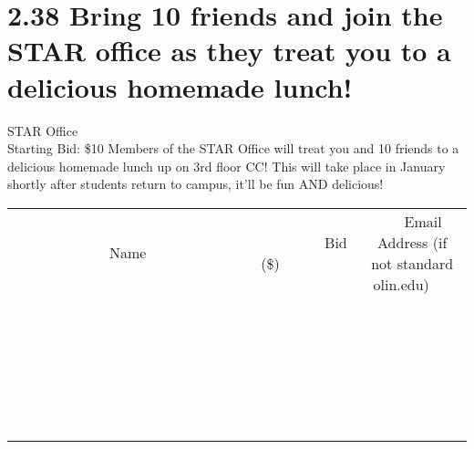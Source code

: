 \documentclass[11pt]{article}
\begin{document}
\section*{2.38 Bring 10 friends and join the STAR office as they treat you to a delicious homemade lunch!    }
STAR Office
\\
Starting Bid: \$10
\newline
Members of the STAR Office will treat you and 10 friends to a delicious homemade lunch up on 3rd floor CC!  This will take place in January shortly after students return to campus, it'll be fun AND delicious!
\\[6ex]
\begin{tabular}{c c c}
~~~~~~~~~~~~~Name~~~~~~~~~~~~~ & ~~~~~~~~~Bid (\$)~~~~~~~~~  & ~~~Email Address (if not standard olin.edu)~~~\\
 & & \\
\hline
 & & \\
\hline
 & & \\
\hline
 & & \\
\hline
 & & \\
\hline
 & & \\
\hline
 & & \\
\hline
 & & \\
\hline
 & & \\
\hline
 & & \\
\hline
 & & \\
\hline
 & & \\
\hline
 & & \\
\hline
 & & \\
\hline
 & & \\
\hline
 & & \\
\hline
 & & \\
\hline
 & & \\
\hline
 & & \\
\hline
 & & \\
\hline
 & & \\
\hline
 & & \\
\hline
 & & \\
\hline
 & & \\
\hline
 & & \\
\hline
 & & \\
\hline
\end{tabular}
\newpage
\end{document}
